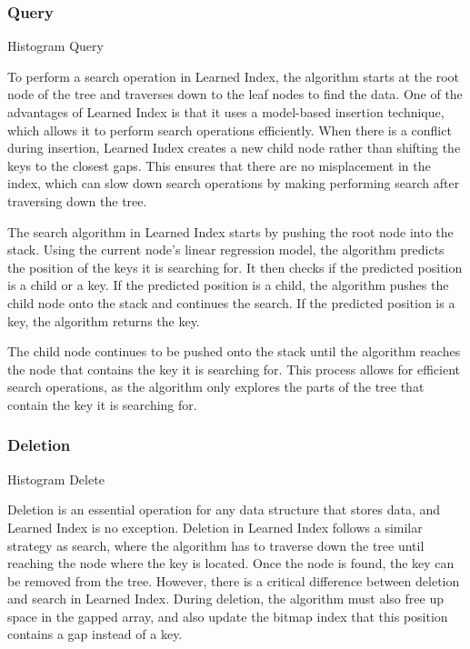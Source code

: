 \documentclass[11pt,a4paper]{article}
\newcommand{\learnindex}{\textsf{Learned Index}\xspace}
\begin{document}
\subsubsection{Query}
\begin{algorithm}
\caption{Histogram Query}
\begin{algorithmic}[1]


\EndProcedure
\end{algorithmic}
\end{algorithm}

To perform a search operation in \learnindex, the algorithm starts at the root node of the tree and traverses down to the leaf nodes to find the data. One of the advantages of \learnindex is that it uses a model-based insertion technique, which allows it to perform search operations efficiently. When there is a conflict during insertion, \learnindex creates a new child node rather than shifting the keys to the closest gaps. This ensures that there are no misplacement in the index, which can slow down search operations by making performing search after traversing down the tree.

The search algorithm in \learnindex starts by pushing the root node into the stack. Using the current node's linear regression model, the algorithm predicts the position of the keys it is searching for. It then checks if the predicted position is a child or a key. If the predicted position is a child, the algorithm pushes the child node onto the stack and continues the search. If the predicted position is a key, the algorithm returns the key.

The child node continues to be pushed onto the stack until the algorithm reaches the node that contains the key it is searching for. This process allows for efficient search operations, as the algorithm only explores the parts of the tree that contain the key it is searching for.

\subsubsection{Deletion}

\begin{algorithm}
\caption{Histogram Delete}
\begin{algorithmic}[1]


\EndProcedure
\end{algorithmic}
\end{algorithm}
Deletion is an essential operation for any data structure that stores data, and \learnindex is no exception. Deletion in \learnindex follows a similar strategy as search, where the algorithm has to traverse down the tree until reaching the node where the key is located. Once the node is found, the key can be removed from the tree.
However, there is a critical difference between deletion and search in \learnindex. During deletion, the algorithm must also free up space in the gapped array, and also update the bitmap index that this position contains a gap instead of a key.
\end{document}
